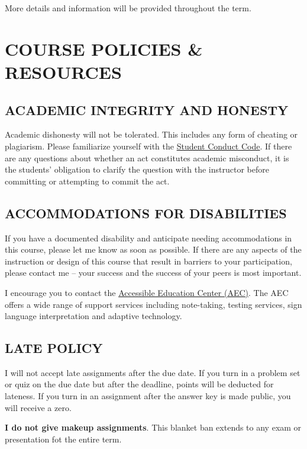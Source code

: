 \documentclass[11pt]{article}
\begin{document}
\noindent More details and information will be provided throughout the term. 

\newpage

\section*{COURSE POLICIES \& RESOURCES}

\subsection*{ACADEMIC INTEGRITY AND HONESTY}
Academic dishonesty will not be tolerated.
This includes any form of cheating or plagiarism.
Please familiarize yourself with the \href{https://policies.uoregon.edu/vol-3-administration-student-affairs/ch-1-conduct/student-conduct-code}{Student Conduct Code}.
If there are any questions about whether an act constitutes academic misconduct, it is the students' obligation to clarify the question with the instructor before committing or attempting to commit the act.

\subsection*{ACCOMMODATIONS FOR DISABILITIES}
If you have a documented disability and anticipate needing accommodations in this course, please let me know as soon as possible.
If there are any aspects of the instruction or design of this course that result in barriers to your participation, please contact me -- your success and the success of your peers is most important. 

I encourage you to contact the \href{https://aec.uoregon.edu/}{Accessible Education Center (AEC)}. The AEC offers a wide range of support services including note-taking, testing services, sign language interpretation and adaptive technology.

\subsection*{LATE POLICY}
I will not accept late assignments after the due date. 
If you turn in a problem set or quiz on the due date but after the deadline, points will be deducted for lateness. 
If you turn in an assignment after the answer key is made public, you will receive a zero. 

\textbf{I do not give makeup assignments}. 
This blanket ban extends to any exam or presentation fot the entire term. 
\end{document}
